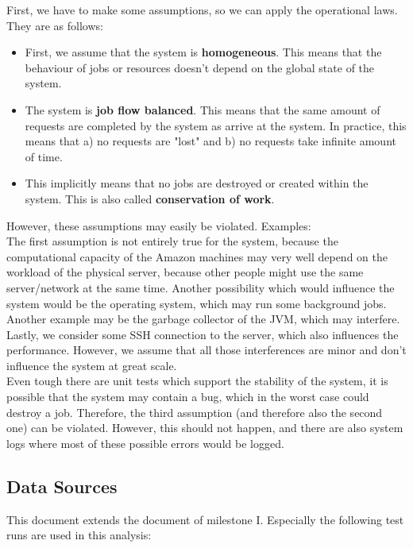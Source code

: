 \documentclass[a4paper]{article}
\begin{document}
{First, we have to make some assumptions, so we can apply the operational laws. They are as follows:

\begin{itemize}
\item First, we assume that the system is \textbf{homogeneous}. This means that the behaviour of jobs or resources doesn't depend on the global state of the system.
\item The system is \textbf{job flow balanced}. This means that the same amount of requests are completed by the system as arrive at the system. In practice, this means that a) no requests are "lost" and b) no requests take infinite amount of time.
\item This implicitly means that no jobs are destroyed or created within the system. This is also called \textbf{conservation of work}.
\end{itemize}

However, these assumptions may easily be violated. Examples:\\

The first assumption is not entirely true for the system, because the computational capacity of the Amazon machines may very well depend on the workload of the physical server, because other people might use the same server/network at the same time. Another possibility which would influence the system would be the operating system, which may run some background jobs. Another example may be the garbage collector of the JVM, which may interfere. Lastly, we consider some SSH connection to the server, which also influences the performance. However, we assume that all those interferences are minor and don't influence the system at great scale.\\

Even tough there are unit tests which support the stability of the system, it is possible that the system may contain a bug, which in the worst case could destroy a job. Therefore, the third assumption (and therefore also the second one) can be violated. However, this should not happen, and there are also system logs where most of these possible errors would be logged.\\

\subsection{Data Sources}

This document extends the document of milestone I. Especially the following test runs are used in this analysis:

}
\end{document}
